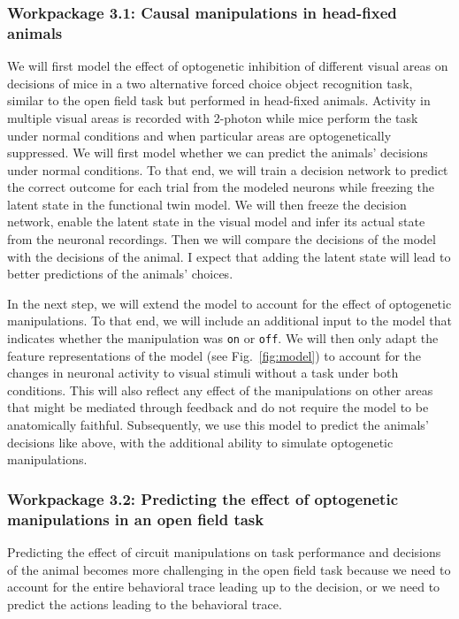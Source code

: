 \documentclass[B2,COG]{ercgrant}
\begin{document}
\subsubsection{Workpackage 3.1: Causal manipulations in head-fixed animals\hfill{}}
We will first model the effect of optogenetic inhibition of different visual areas on decisions of mice in a two alternative forced choice object recognition task, similar to the open field task but performed in head-fixed animals. 
Activity in multiple visual areas is recorded with 2-photon while mice perform the task under normal conditions and when particular areas are optogenetically suppressed.
We will first model whether we can predict the animals' decisions under normal conditions. 
To that end, we will train a decision network to predict the correct outcome for each trial from the modeled neurons while freezing the  latent state in the functional twin model.
We will then freeze the decision network, enable the latent state in the visual model and infer its actual state from the neuronal recordings. 
Then we will compare the decisions of the model with the decisions of the animal. 
I expect that adding the latent state will lead to better predictions of the animals' choices. 

In the next step, we will extend the model to account for the effect of optogenetic manipulations. 
To that end, we will include an additional input to the model that indicates whether the manipulation was \texttt{on} or \texttt{off}. 
We will then only adapt the feature representations of the model (see Fig.~\ref{fig:model}) to account for the changes in neuronal activity to visual stimuli without a task under both conditions.
This will also reflect any effect of the manipulations on other areas that might be mediated through feedback and do not require the model to be anatomically faithful. 
Subsequently, we use this model to predict the animals' decisions like above, with the additional ability to simulate optogenetic manipulations.

\subsubsection{Workpackage 3.2: Predicting the effect of optogenetic manipulations in an open field task\hfill{}}

Predicting the effect of circuit manipulations on task performance and decisions of the animal becomes more challenging in the open field task because we need to account for the entire behavioral trace leading up to the decision, or we need to predict the actions leading to the behavioral trace.
\end{document}
